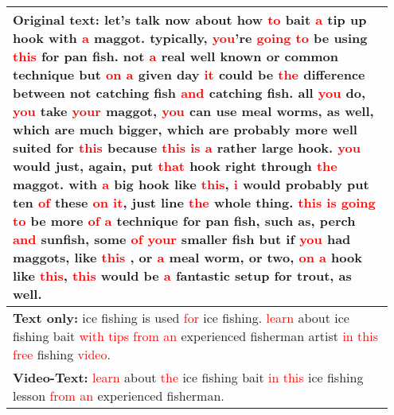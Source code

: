 \documentclass[11pt,a4paper]{article}
\newcommand\Tstrut{\rule{0pt}{2.6ex}}         \newcommand\Bstrut{\rule[-0.9ex]{0pt}{0pt}}
\begin{document}
\begin{table}
    \centering
    \footnotesize
    \begin{tabular}{|p{0.95\linewidth}|}
        \hline
        \Tstrut
        \textbf{Original text:} let’s talk now about how \textcolor{red}{to} bait \textcolor{red}{a} tip up hook with \textcolor{red}{a} maggot. typically, \textcolor{red}{you}'re \textcolor{red}{going} \textcolor{red}{to} be using \textcolor{red}{this} for pan fish. not \textcolor{red}{a} real well known or common technique but \textcolor{red}{on} \textcolor{red}{a} given day \textcolor{red}{it} could be \textcolor{red}{the} difference between not catching fish \textcolor{red}{and} catching fish. all \textcolor{red}{you} do, \textcolor{red}{you} take \textcolor{red}{your} maggot, \textcolor{red}{you} can use meal worms, as well, which are much bigger, which are probably more well suited for \textcolor{red}{this} because \textcolor{red}{this} \textcolor{red}{is} \textcolor{red}{a} rather large hook. \textcolor{red}{you} would just, again, put \textcolor{red}{that} hook right through \textcolor{red}{the} maggot. with \textcolor{red}{a} big hook like \textcolor{red}{this}, \textcolor{red}{i} would probably put ten \textcolor{red}{of} these \textcolor{red}{on} \textcolor{red}{it}, just line \textcolor{red}{the} whole thing. \textcolor{red}{this} \textcolor{red}{is} \textcolor{red}{going} \textcolor{red}{to} be more \textcolor{red}{of} \textcolor{red}{a} technique for pan fish, such as, perch \textcolor{red}{and} sunfish, some \textcolor{red}{of} \textcolor{red}{your} smaller fish but if \textcolor{red}{you} had maggots, like \textcolor{red}{this} , or \textcolor{red}{a} meal worm, or two, \textcolor{red}{on} \textcolor{red}{a} hook like \textcolor{red}{this}, \textcolor{red}{this} would be \textcolor{red}{a} fantastic setup for trout, as well.\Bstrut\\
        \hline
        \Tstrut
        \textbf{Text only:} ice fishing is used \textcolor{red}{for} ice fishing. \textcolor{red}{learn} about ice fishing bait \textcolor{red}{with} \textcolor{red}{tips} \textcolor{red}{from} \textcolor{red}{an} experienced fisherman artist \textcolor{red}{in} \textcolor{red}{this} \textcolor{red}{free} fishing \textcolor{red}{video}.\Bstrut\\
        \hline
        \Tstrut
        \textbf{Video-Text:} \textcolor{red}{learn} about \textcolor{red}{the} ice fishing bait \textcolor{red}{in} \textcolor{red}{this} ice fishing lesson \textcolor{red}{from} \textcolor{red}{an} experienced fisherman.\Bstrut\\

\end{tabular}
\end{table}
\end{document}
